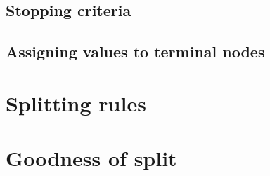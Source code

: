 \subsection{Stopping criteria}



\subsection{Assigning values to terminal nodes}
\label{sec:3:assignment}



\section{Splitting rules}
\label{sec:3:splitting-rules}


\section{Goodness of split}
\label{sec:3:criteria}


